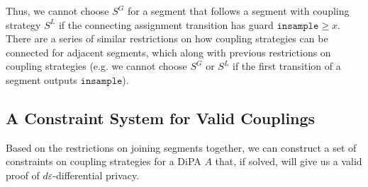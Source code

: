 \documentclass[12pt]{article}
\newcommand{\gguard}[1][x]{\texttt{insample}\geq #1}
\theoremstyle{definition}
\begin{document}
Thus, we cannot choose $S^G$ for a segment that follows a segment with coupling strategy $S^L$ if the connecting assignment transition has guard $\gguard$. There are a series of similar restrictions on how coupling strategies can be connected for adjacent segments, which along with previous restrictions on coupling strategies (e.g. we cannot choose $S^G$ or $S^L$ if the first transition of a segment outputs $\texttt{insample}$).

\subsection{A Constraint System for Valid Couplings}

Based on the restrictions on joining segments together, we can construct a set of constraints on coupling strategies for a DiPA $A$ that, if solved, will give us a valid proof of $d\varepsilon$-differential privacy.
\end{document}
